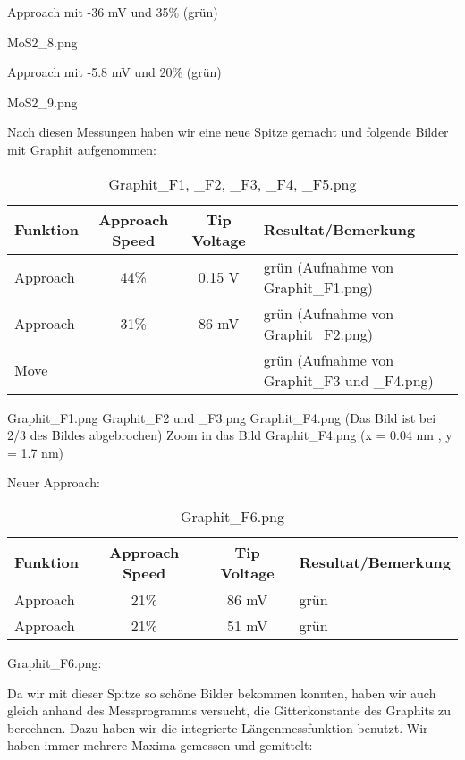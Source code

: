 Approach mit -36 mV und 35\% (grün)

MoS2\_8.png 

Approach mit -5.8 mV und 20\% (grün)

MoS2\_9.png 

Nach diesen Messungen haben wir eine neue Spitze gemacht und folgende Bilder mit Graphit aufgenommen:

\begin{table}[H]
\caption{Graphit\_F1, \_F2, \_F3, \_F4, \_F5.png}
\centering \begin{tabular}[H]{l c c l}
Funktion & Approach Speed & Tip Voltage & Resultat/Bemerkung\\ \hline
Approach & 44\% & 0.15 V & grün (Aufnahme von Graphit\_F1.png)\\
Approach & 31\% & 86 mV & grün (Aufnahme von Graphit\_F2.png)\\
Move & & & grün (Aufnahme von Graphit\_F3 und \_F4.png)
\end{tabular}
\end{table}

Graphit\_F1.png 
Graphit\_F2 und \_F3.png 
Graphit\_F4.png (Das Bild ist bei 2/3 des Bildes abgebrochen) 
Zoom in das Bild Graphit\_F4.png (x = 0.04 nm , y = 1.7 nm) 

Neuer Approach:

\begin{table}[H]
\caption{Graphit\_F6.png}
\centering \begin{tabular}[H]{l c c l}
Funktion & Approach Speed & Tip Voltage & Resultat/Bemerkung\\ \hline
Approach & 21\% & 86 mV & grün\\ 
Approach & 21\% & 51 mV & grün
\end{tabular}
\end{table}

Graphit\_F6.png: 

Da wir mit dieser Spitze so schöne Bilder bekommen konnten, haben wir auch gleich anhand des Messprogramms versucht, die Gitterkonstante des Graphits zu berechnen. Dazu haben wir die integrierte Längenmessfunktion benutzt. Wir haben immer mehrere Maxima gemessen und gemittelt:

